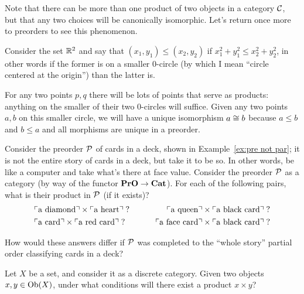 \documentclass[CT4S-EN-RU]{subfiles}
\begin{document}
\begin{exampleENG}
Note that there can be more than one product of two objects in a category $\mathcal{C}$, but that any two choices will be canonically isomorphic. Let's return once more to preorders to see this phenomenon.

Consider the set ${\mathbb R}^2$ and say that $(x_1,y_1)\leq (x_2,y_2)$ if $x_1^2+y_1^2\leq x_2^2+y_2^2$, in other words if the former is on a smaller 0-circle (by which I mean “circle centered at the origin”) than the latter is. 

For any two points $p,q$ there will be lots of points that serve as products: anything on the smaller of their two 0-circles will suffice. Given any two points $a,b$ on this smaller circle, we will have a unique isomorphism $a\cong b$ because $a\leq b$ and $b\leq a$ and all morphisms are unique in a preorder.
\end{exampleENG}

\begin{exampleRUS}
\end{exampleRUS}

\begin{exerciseENG}
Consider the preorder $\mathcal{P}$ of cards in a deck, shown in Example~\ref{ex:pre not par}; it is not the entire story of cards in a deck, but take it to be so. In other words, be like a computer and take what's there at face value. Consider the preorder $\mathcal{P}$ as a category (by way of the functor ${\mathbf{PrO}}\rightarrow{\mathbf{Cat}}$).
\sexc For each of the following pairs, what is their product in $\mathcal{P}$ (if it exists)?
\begin{align*}
&\textnormal{$\ulcorner$a diamond$\urcorner$}\times\textnormal{$\ulcorner$a heart$\urcorner$}\;? \hspace{.3in} &\textnormal{$\ulcorner$a queen$\urcorner$}\times\textnormal{$\ulcorner$a black card$\urcorner$}\;?\\
& \textnormal{$\ulcorner$a card$\urcorner$}\times\textnormal{$\ulcorner$a red card$\urcorner$}\;?\hspace{.3in}&\textnormal{$\ulcorner$a face card$\urcorner$}\times\textnormal{$\ulcorner$a black card$\urcorner$}\;?
\end{align*}
\item How would these answers differ if $\mathcal{P}$ was completed to the “whole story” partial order classifying cards in a deck?
\endsexc
\end{exerciseENG}

\begin{exerciseRUS}
\end{exerciseRUS}

\begin{exerciseENG}
Let $X$ be a set, and consider it as a discrete category. Given two objects $x,y\in\textnormal{Ob}(X)$, under what conditions will there exist a product $x\times y$?
\end{exerciseENG}
\end{document}
